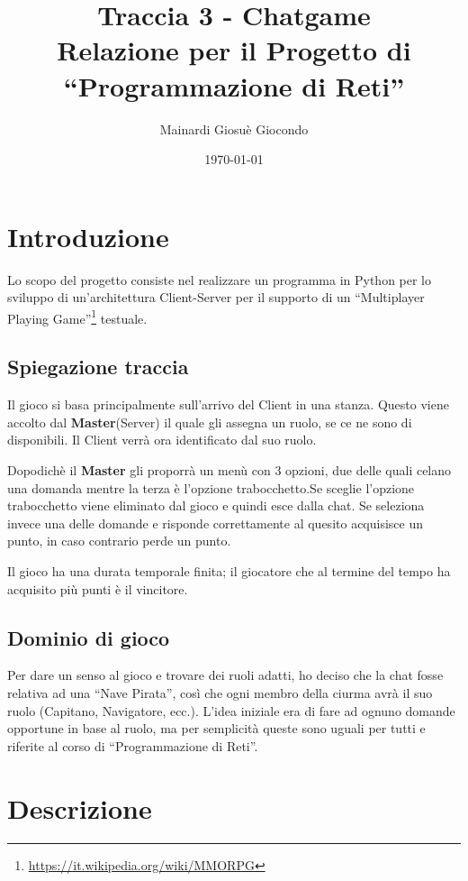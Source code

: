 \documentclass[a4paper,12pt]{report}
\title{\textbf{Traccia 3 - Chatgame}\\Relazione per il Progetto di \\``Programmazione di Reti''}
\author{Mainardi Giosuè Giocondo}
\date{\today}
\begin{document}
\maketitle

\tableofcontents

\chapter{Introduzione}
Lo scopo del progetto consiste nel realizzare un programma in Python per lo sviluppo di un'architettura Client-Server
%
per il supporto di un ``Multiplayer Playing Game''\footnote{\url{https://it.wikipedia.org/wiki/MMORPG}} testuale.

\section{Spiegazione traccia}

Il gioco si basa principalmente sull'arrivo del Client in una stanza. Questo viene accolto dal \textbf{Master}(Server) il quale 
gli assegna un ruolo, se ce ne sono di disponibili. Il Client verrà ora identificato dal suo ruolo.

Dopodichè il \textbf{Master} gli proporrà un menù con 3 opzioni, due delle quali celano una domanda mentre la
terza è l’opzione trabocchetto.Se sceglie l’opzione trabocchetto viene eliminato dal gioco e quindi esce dalla chat.
Se seleziona invece una delle domande e risponde correttamente al quesito acquisisce un punto, in caso contrario perde un punto.

Il gioco ha una durata temporale finita; il giocatore che al
termine del tempo ha acquisito più punti è il vincitore.

\section{Dominio di gioco}
Per dare un senso al gioco e trovare dei ruoli adatti, ho deciso che la chat fosse relativa ad una 
``Nave Pirata'', così che ogni membro della ciurma avrà il suo ruolo (Capitano, Navigatore, ecc.).
%
L'idea iniziale era di fare ad ognuno domande opportune in base al ruolo, ma per semplicità queste sono
uguali per tutti e riferite al corso di ``Programmazione di Reti''.

\chapter{Descrizione}
\end{document}
